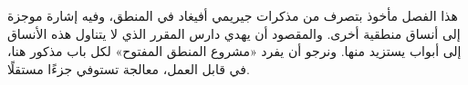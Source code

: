\documentclass[../../../include/open-logic-chapter]{subfiles}
\begin{document}

\begin{editorial}
  هذا الفصل مأخوذ بتصرف من مذكرات جيريمي أفيغاد في المنطق،
  وفيه إشارة موجزة إلى أنساق منطقية أخرى. والمقصود أن يهدي
  دارس المقرر الذي لا يتناول هذه الأنساق إلى أبواب يستزيد منها.
  ونرجو أن يفرد «مشروع المنطق المفتوح» لكل باب مذكور هنا،
  في قابل العمل، معالجة تستوفي جزءًا مستقلًا.
\end{editorial}








\OLEndChapterHook
\end{document}
